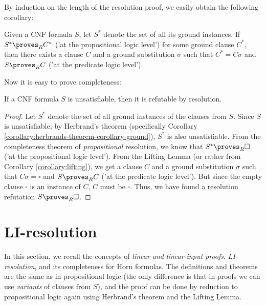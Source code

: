 By induction on the length of the resolution proof, we easily obtain the following corollary:

\begin{corollary}\label{corollary:lifting}
Given a CNF formula $S$, let $S^*$ denote the set of all its ground instances. If $S^*\proves_R C^*$ ('at the propositional logic level') for some ground clause $C^*$, then there exists a clause $C$ and a ground substitution $\sigma$ such that $C^*=C\sigma$ and $S\proves_R C$ ('at the predicate logic level').
\end{corollary}

Now it is easy to prove completeness:

\begin{theorem}\label{theorem:completeness-of-predicate-resolution}
    If a CNF formula $S$ is unsatisfiable, then it is refutable by resolution.
\end{theorem}
\begin{proof}
Let $S^*$ denote the set of all ground instances of the clauses from $S$. Since $S$ is unsatisfiable, by Herbrand's theorem (specifically Corollary \ref{corollary:herbrands-theorem-corollary-ground}), $S^*$ is also unsatisfiable. From the completeness theorem of \emph{propositional} resolution, we know that $S^*\proves_R\square$ ('at the propositional logic level'). From the Lifting Lemma (or rather from Corollary \ref{corollary:lifting}), we get a clause $C$ and a ground substitution $\sigma$ such that $C\sigma=\square$ and $S\proves_R C$ ('at the predicate logic level'). But since the empty clause $\square$ is an instance of $C$, $C$ must be $\square$. Thus, we have found a resolution refutation $S\proves_R \square$.
\end{proof}


\section{LI-resolution}\label{section:predicate-LI-resolution}

In this section, we recall the concepts of \emph{linear and linear-input proofs}, \emph{LI-resolution}, and its completeness for Horn formulas. The definitions and theorems are the same as in propositional logic (the only difference is that in proofs we can use \emph{variants} of clauses from $S$), and the proof can be done by reduction to propositional logic again using Herbrand's theorem and the Lifting Lemma.

